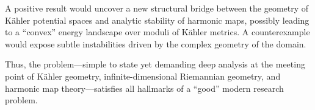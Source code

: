 A positive result would uncover a new structural bridge between the geometry of Kähler potential spaces and analytic stability of harmonic maps, possibly leading to a “convex” energy landscape over moduli of Kähler metrics. A counterexample would expose subtle instabilities driven by the complex geometry of the domain.  

Thus, the problem—simple to state yet demanding deep analysis at the meeting point of Kähler geometry, infinite-dimensional Riemannian geometry, and harmonic map theory—satisfies all hallmarks of a “good” modern research problem.